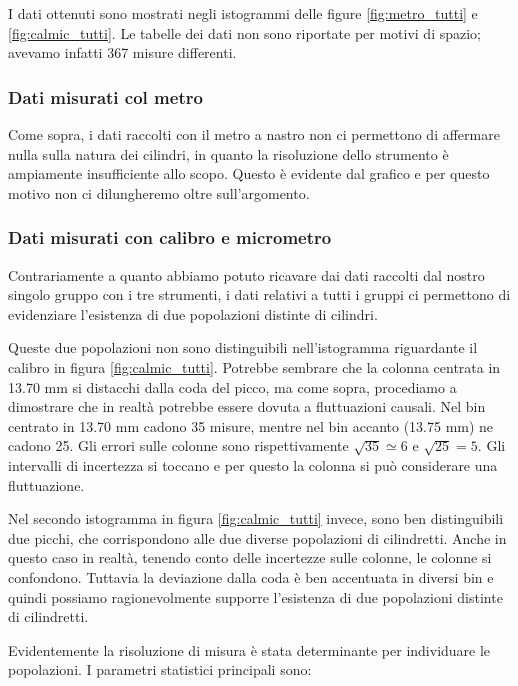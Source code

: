 I dati ottenuti sono mostrati negli istogrammi delle figure \ref{fig:metro_tutti} e \ref{fig:calmic_tutti}.
Le tabelle dei dati non sono riportate per motivi di spazio; avevamo infatti 367 misure differenti.

\subsubsection{Dati misurati col metro}

Come sopra, i dati raccolti con il metro a nastro non ci permettono
di affermare nulla sulla natura dei cilindri, in quanto la risoluzione dello strumento
è ampiamente insufficiente allo scopo. Questo è evidente dal grafico e per
questo motivo non ci dilungheremo oltre sull'argomento.

\subsubsection{Dati misurati con calibro e micrometro}

Contrariamente a quanto abbiamo potuto ricavare dai dati
raccolti dal nostro singolo gruppo con i tre strumenti, i dati relativi
a tutti i gruppi ci permettono di evidenziare l'esistenza di due popolazioni
distinte di cilindri.

Queste due popolazioni non sono distinguibili nell'istogramma riguardante il calibro
in figura \ref{fig:calmic_tutti}. Potrebbe sembrare che la colonna centrata
in 13.70 mm si distacchi dalla coda del picco, ma come sopra, procediamo a dimostrare
che in realtà potrebbe essere dovuta a fluttuazioni causali.
Nel bin centrato in 13.70 mm cadono 35 misure, mentre nel bin accanto (13.75 mm) ne cadono 25.
Gli errori sulle colonne sono rispettivamente $\sqrt{35} \simeq 6$ e $\sqrt{25} = 5$.
Gli intervalli di incertezza si toccano e per questo la colonna si può considerare
una fluttuazione.

Nel secondo istogramma in figura \ref{fig:calmic_tutti} invece, sono ben distinguibili due picchi,
che corrispondono alle due diverse popolazioni di cilindretti. Anche in questo caso in realtà,
tenendo conto delle incertezze sulle colonne, le colonne si confondono. Tuttavia
la deviazione dalla coda è ben accentuata in diversi bin e quindi possiamo ragionevolmente 
supporre l'esistenza di due popolazioni distinte di cilindretti.

Evidentemente la risoluzione di misura è stata determinante per individuare le popolazioni.
I parametri statistici principali sono:


